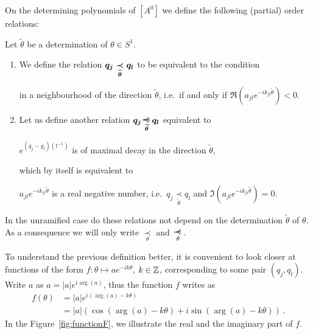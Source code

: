 On the determining polynomials of $[A^0]$ we define the following (partial)
order relations:
\begin{defn}\label{defn:definingRelations}
  Let $\tilde\theta$ be a determination of $\theta\in S^1$.
  \begin{enumerate}
  \item We define the relation
    $\boldmath q_j \underset{\tilde\theta}{\prec} q_l$ to be equivalent to
    the condition
    \begin{einr}
       in a neighbourhood of
      the direction $\tilde\theta$, i.e.\ if and only if
      $\Re(a_{jl}e^{-ik_{jl}\tilde\theta})<0$.
    \end{einr}
  \item Let us define another relation $\boldmath q_j\myrel{\tilde\theta}q_l$
    equivalent to
    \begin{einr}
      $e^{(q_j-g_l)(t^{-1})}$ is of maximal decay in the direction
      $\tilde\theta$,
    \end{einr}
    which by itself is equivalent to
    \begin{einr}
      $a_{jl}e^{-ik_{jl}\tilde\theta}$ is a real negative
      number, i.e.\ $q_j \underset{\tilde\theta}{\prec} q_l$ and
      $\Im(a_{jl}e^{-ik_{jl}\tilde\theta})=0$.
    \end{einr}
  \end{enumerate}
  \begin{s-rem}
    In the unramified case do these relations not depend on the determination
    $\tilde\theta$ of $\theta$. As a consequence we will only write
    $\underset{\theta}{\prec}$ and $\myrel{\theta}$.
  \end{s-rem}
\end{defn}
To understand the previous definition better, it is convenient to look closer at
functions of the form $f:\theta\mapsto ae^{-ik\theta}$, $k\in\Z$, corresponding
to some pair $(q_j,q_l)$.
Write $a$ as $a=|a|e^{i\arg(a)}$, thus the function $f$ writes as
\begin{align*}
  f(\theta)&=|a|e^{i(\arg(a)-k\theta)}
  \\&=|a|(\cos(\arg(a)-k\theta) + i\sin(\arg(a)-k\theta)) \,.
\end{align*}
In the Figure~\ref{fig:functionF}, we illustrate the real and the imaginary
part of $f$.
